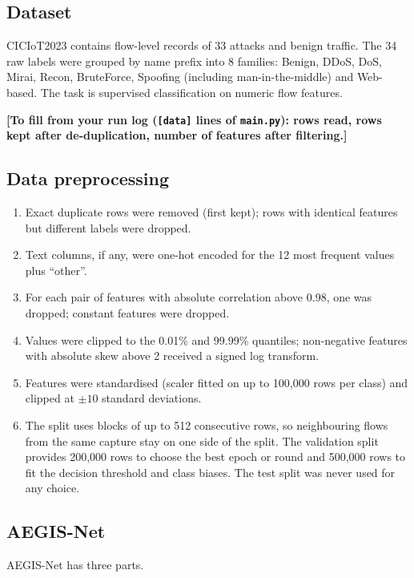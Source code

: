 \documentclass[11pt,a4paper]{article}
\newcommand{\aegis}{AEGIS-Net}
\begin{document}
\subsection{Dataset}
CICIoT2023 \cite{neto2023ciciot} contains flow-level records of 33 attacks and benign traffic. The 34 raw labels were grouped by name prefix into 8 families: Benign, DDoS, DoS, Mirai, Recon, BruteForce, Spoofing (including man-in-the-middle) and Web-based. The task is supervised classification on numeric flow features.

\textbf{[To fill from your run log (\texttt{[data]} lines of \texttt{main.py}): rows read, rows kept after de-duplication, number of features after filtering.]}

\subsection{Data preprocessing}
\begin{enumerate}
  \item Exact duplicate rows were removed (first kept); rows with identical features but different labels were dropped.
  \item Text columns, if any, were one-hot encoded for the 12 most frequent values plus ``other''.
  \item For each pair of features with absolute correlation above 0.98, one was dropped; constant features were dropped.
  \item Values were clipped to the 0.01\% and 99.99\% quantiles; non-negative features with absolute skew above 2 received a signed log transform.
  \item Features were standardised (scaler fitted on up to 100{,}000 rows per class) and clipped at $\pm 10$ standard deviations.
  \item The split uses blocks of up to 512 consecutive rows, so neighbouring flows from the same capture stay on one side of the split. The validation split provides 200{,}000 rows to choose the best epoch or round and 500{,}000 rows to fit the decision threshold and class biases. The test split was never used for any choice.
\end{enumerate}

\subsection{\aegis}
\aegis{} has three parts.
\end{document}
